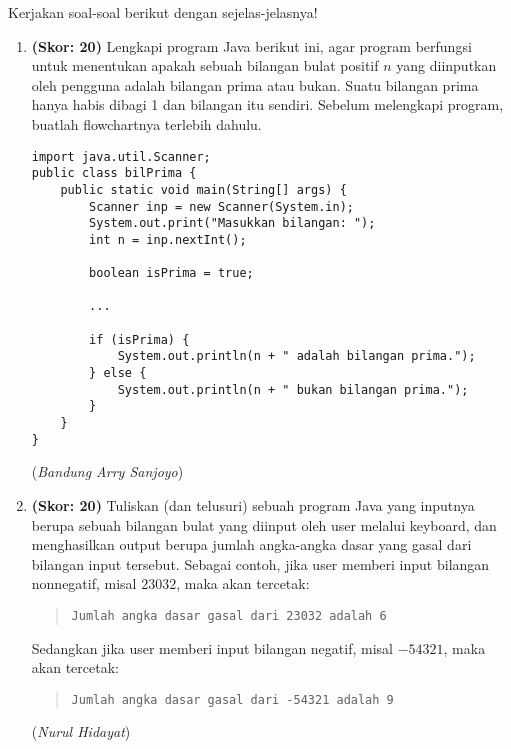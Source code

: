 \documentclass{article}
\begin{document}
\noindent
Kerjakan soal-soal berikut dengan sejelas-jelasnya!
\begin{enumerate}
    \item \textbf{(Skor: 20)} Lengkapi program Java berikut ini, agar program berfungsi untuk menentukan apakah sebuah bilangan bulat positif $n$ yang diinputkan oleh pengguna adalah bilangan prima atau bukan. Suatu bilangan prima hanya habis dibagi 1 dan bilangan itu sendiri. Sebelum melengkapi program, buatlah flowchartnya terlebih dahulu.
    \begin{verbatim}
import java.util.Scanner;
public class bilPrima {
    public static void main(String[] args) {
        Scanner inp = new Scanner(System.in);
        System.out.print("Masukkan bilangan: ");
        int n = inp.nextInt();
    
        boolean isPrima = true;
        
        ...
        
        if (isPrima) {
            System.out.println(n + " adalah bilangan prima.");
        } else {
            System.out.println(n + " bukan bilangan prima.");
        }
    }
}
    \end{verbatim}
    \begin{flushright}
        (\textit{Bandung Arry Sanjoyo})
    \end{flushright}

    \item \textbf{(Skor: 20)} Tuliskan (dan telusuri) sebuah program Java yang inputnya berupa sebuah bilangan bulat yang diinput oleh user melalui keyboard, dan menghasilkan output berupa jumlah angka-angka dasar yang gasal dari bilangan input tersebut. Sebagai contoh, jika user memberi input bilangan nonnegatif, misal $23032$, maka akan tercetak:

    \begin{quote}
        \centering
        \texttt{Jumlah angka dasar gasal dari 23032 adalah 6}
    \end{quote}

    Sedangkan jika user memberi input bilangan negatif, misal $-54321$, maka akan tercetak:

    \begin{quote}
        \centering
        \texttt{Jumlah angka dasar gasal dari -54321 adalah 9}
    \end{quote}

    \begin{flushright}
        (\textit{Nurul Hidayat})
    \end{flushright}
    

\end{enumerate}
\end{document}
